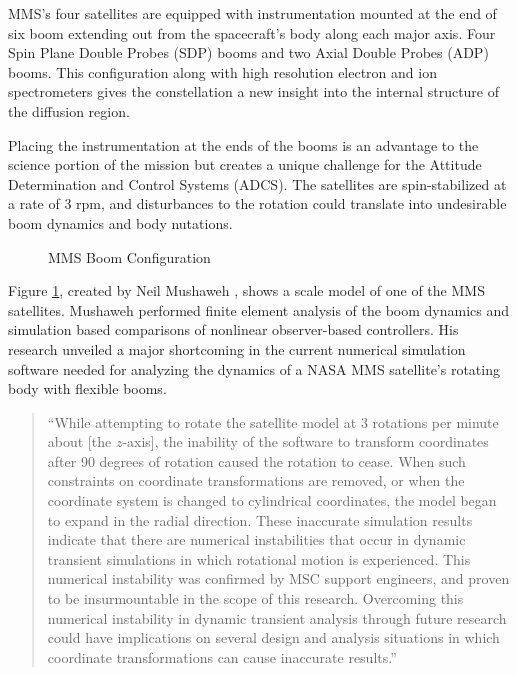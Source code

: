 MMS's four satellites are equipped with instrumentation mounted at the end of six boom extending out from the spacecraft's body along each major axis.  Four Spin Plane Double Probes (SDP) booms and two Axial Double Probes (ADP) booms.  This configuration along with high resolution electron and ion spectrometers gives the constellation a new insight into the internal structure of the diffusion region.

Placing the instrumentation at the ends of the booms is an advantage to the science portion of the mission but creates a unique challenge for the Attitude Determination and Control Systems (ADCS).  The satellites are spin-stabilized at a rate of 3 rpm, and disturbances to the rotation could translate into undesirable boom dynamics and body nutations.

\begin{figure}[H]
  \centerline{}
  \caption{MMS Boom Configuration \cite{mushawehthesis}}
  \label{fig:booms}
\end{figure}

Figure \ref{fig:booms}, created by Neil Mushaweh \cite{mushawehthesis}, shows a scale model of one of the MMS satellites.  Mushaweh performed finite element analysis of the boom dynamics and simulation based comparisons of nonlinear observer-based controllers.  His research unveiled a major shortcoming in the current numerical simulation software needed for analyzing the dynamics of a NASA MMS satellite's rotating body with flexible booms.

\begin{quote}{``While attempting to rotate the satellite model at 3 rotations per minute about [the $z$-axis], the inability of the software to transform coordinates after 90 degrees of rotation caused the rotation to cease. When such constraints on coordinate transformations are removed, or when the coordinate system is changed to cylindrical coordinates, the model began to expand in the radial direction. These inaccurate simulation results indicate that there are numerical instabilities that occur in dynamic transient simulations in which rotational motion is experienced. This numerical instability was confirmed by MSC support engineers, and proven to be insurmountable in the scope of this research. Overcoming this numerical instability in dynamic transient analysis through future research could have implications on several design and analysis situations in which coordinate transformations can cause inaccurate results.''~\cite{mushawehthesis}}\end{quote}



